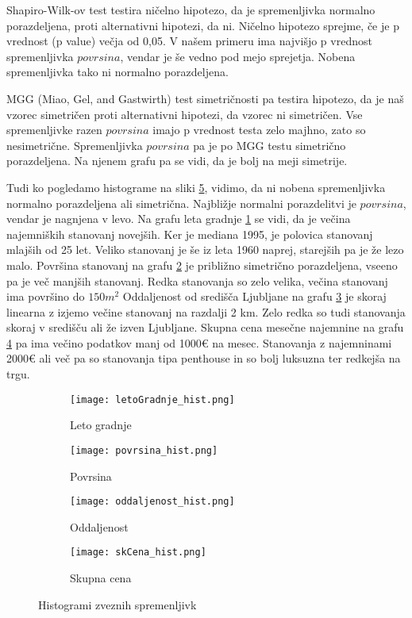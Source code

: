 \documentclass[a4paper, 12pt]{article}
\begin{document}
Shapiro-Wilk-ov test testira ničelno hipotezo, da je spremenljivka normalno
porazdeljena, proti alternativni hipotezi, da ni. Ničelno hipotezo sprejme, če
je p vrednost (p value) večja od 0,05. V našem primeru ima najvišjo p vrednost
spremenljivka $ povrsina $, vendar je še vedno pod mejo sprejetja. Nobena
spremenljivka tako ni normalno porazdeljena.

MGG (Miao, Gel, and Gastwirth) test simetričnosti pa testira hipotezo, da
je naš vzorec simetričen proti alternativni hipotezi, da vzorec ni simetričen.
Vse spremenljivke razen $ povrsina $ imajo p vrednost testa zelo majhno,
zato so nesimetrične. Spremenljivka $ povrsina $ pa je po MGG testu simetrično
porazdeljena. Na njenem grafu pa se vidi, da je bolj na meji simetrije.

Tudi ko pogledamo histograme na sliki \ref{figure:1}, vidimo, da ni nobena
spremenljivka normalno porazdeljena ali simetrična. Najbližje normalni
porazdelitvi je $ povrsina $, vendar je nagnjena v levo. Na grafu leta
gradnje \ref{figure:1a} se vidi, da je večina najemniških stanovanj novejših.
Ker je mediana 1995, je polovica stanovanj mlajših od 25 let. Veliko stanovanj
je še iz leta 1960 naprej, starejših pa je že lezo malo. Površina stanovanj na
grafu \ref{figure:1b} je približno simetrično porazdeljena, vseeno pa je več
manjših stanovanj. Redka stanovanja so zelo velika, večina stanovanj ima
površino do $150 m^{2}$ Oddaljenost od središča Ljubljane na grafu
\ref{figure:1c} je skoraj linearna z izjemo večine stanovanj na razdalji 2 km.
Zelo redka so tudi stanovanja skoraj v središču ali že izven Ljubljane.
Skupna cena mesečne najemnine na grafu \ref{figure:1d} pa ima večino podatkov
manj od 1000€ na mesec. Stanovanja z najemninami 2000€ ali več pa so stanovanja
tipa penthouse in so bolj luksuzna ter redkejša na trgu.

\begin{figure}[H]
\begin{subfigure}{0.5\textwidth}
	\texttt{[image: letoGradnje\_hist.png]}
	\caption{Leto gradnje}
	\label{figure:1a}
\end{subfigure}
\begin{subfigure}{0.5\textwidth}
	\texttt{[image: povrsina\_hist.png]}
	\caption{Povrsina}
	\label{figure:1b}
\end{subfigure}

\begin{subfigure}{0.5\textwidth}
	\texttt{[image: oddaljenost\_hist.png]}
	\caption{Oddaljenost}
	\label{figure:1c}
\end{subfigure}
\begin{subfigure}{0.5\textwidth}
	\texttt{[image: skCena\_hist.png]}
	\caption{Skupna cena}
	\label{figure:1d}
\end{subfigure}
\caption{Histogrami zveznih spremenljivk}
\label{figure:1}
\end{figure}
\end{document}
